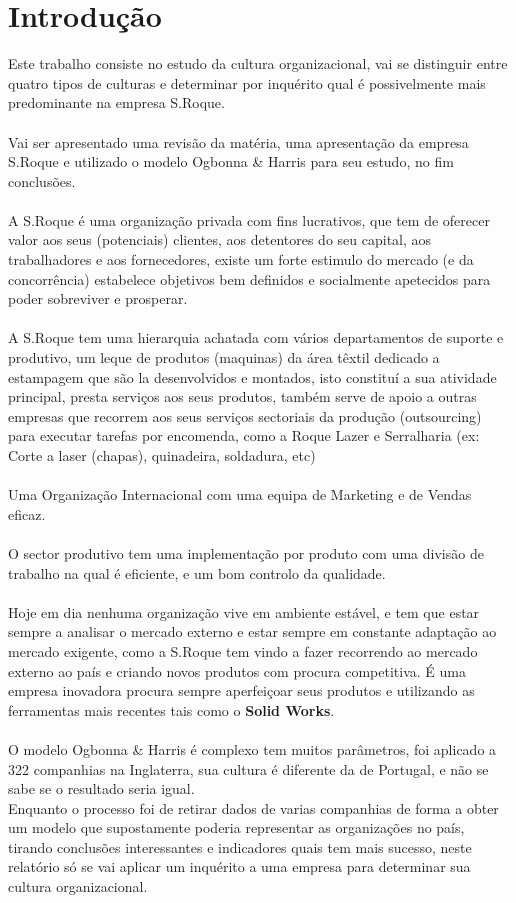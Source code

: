 \section{Introdução}
\qquad Este trabalho consiste no estudo da cultura organizacional, vai se distinguir entre quatro tipos de culturas e determinar por inquérito qual é possivelmente mais predominante na empresa S.Roque.\\
\\
Vai ser apresentado uma revisão da matéria, uma apresentação da empresa S.Roque e utilizado o modelo Ogbonna \& Harris para seu estudo, no fim conclusões.\\
\\
A S.Roque é uma organização privada com fins lucrativos, que tem de oferecer valor aos seus (potenciais) clientes, aos detentores do seu capital, aos trabalhadores e aos fornecedores, existe um forte estimulo do mercado (e da concorrência) estabelece objetivos bem definidos e socialmente apetecidos para poder sobreviver e prosperar.\cite{book_10}\\
\\
A S.Roque tem uma hierarquia achatada com vários departamentos de suporte e produtivo, um leque de produtos (maquinas) da área têxtil dedicado a estampagem que são la desenvolvidos e montados, isto constituí a sua atividade principal, presta serviços aos seus produtos, também serve de apoio a outras empresas que recorrem aos seus serviços sectoriais da produção (outsourcing) para executar tarefas por encomenda, como a Roque Lazer e Serralharia (ex: Corte a laser (chapas), quinadeira, soldadura, etc)\\
\\
Uma Organização Internacional com uma equipa de Marketing e de Vendas eficaz.\\
\\
O sector produtivo tem uma implementação por produto com uma divisão de trabalho na qual é eficiente, e um bom controlo da qualidade.\\
\\
Hoje em dia nenhuma organização vive em ambiente estável, e tem que estar sempre a analisar o mercado externo e estar sempre em constante adaptação ao mercado exigente, como a S.Roque tem vindo a fazer recorrendo ao mercado externo ao país e criando novos produtos com procura competitiva. É uma empresa inovadora procura sempre aperfeiçoar seus produtos e utilizando as ferramentas mais recentes tais como o \textbf{Solid Works}.\\
\\
O modelo Ogbonna \& Harris é complexo tem muitos parâmetros, foi aplicado a 322 companhias na Inglaterra, sua cultura é diferente da de Portugal, e não se sabe se o resultado seria igual.\\
Enquanto o processo foi de retirar dados de varias companhias de forma a obter um modelo que supostamente poderia representar as organizações no país, tirando conclusões interessantes e indicadores quais tem mais sucesso, neste relatório só se vai aplicar um inquérito a uma empresa para determinar sua cultura organizacional.
\newpage
